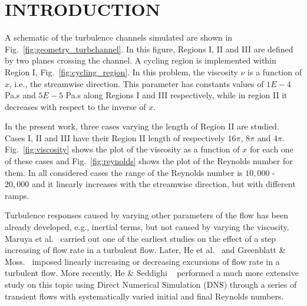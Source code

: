 \documentclass[twocolumn,10pt]{asme2e}
\begin{document}
\begin{nomenclature}
\end{nomenclature}


\section*{INTRODUCTION}

A schematic of the turbulence channels simulated are shown in Fig.~\ref{fig:geometry_turbchannel}. In this figure, Regions I, II and III are defined by two planes crossing the channel. A cycling region is implemented within Region I, Fig.~\ref{fig:cycling_region}.
In this problem, the viscosity \(\nu\) is a function of \(x\), i.e., the streamwise direction. This parameter has constants values of \(1E-4\) Pa.s and \(5E-5\) Pa.s along Regions I and III respectively, while in region II it decreases with respect to the inverse of \(x\).

In the present work, three cases varying the length of Region II are studied. Cases I, II and III have their Region II length of respectively \(16\pi\), \(8\pi\) and \(4\pi\). Fig.~\ref{fig:viscosity} shows the plot of the viscosity as a function of \(x\) for each one of these cases and Fig.~\ref{fig:reynolds} shows the plot of the Reynolds number for them. In all considered cases the range of the Reynolds number is \(10,000\) - \(20,000\) and it linearly increases with the streamwise direction, but with different ramps. 

Turbulence responses caused by varying other parameters of the flow has been already developed, e.g., inertial terms, but not caused by varying the viscosity. Maruya et al.~\cite{maruyama1976} carried out one of the earliest studies on the effect of a step increasing of flow rate in a turbulent flow. Later, He et al.~\cite{he2000} and  Greenblatt \& Moss.~\cite{greenblatt2004} imposed linearly increasing or decreasing excursions of flow rate in a turbulent flow. More recently, He \& Seddighi ~\cite{he2015} performed a much more extensive study on this topic using Direct Numerical Simulation (DNS) through a series of transient flows with systematically varied initial and final Reynolds numbers.
\end{document}
